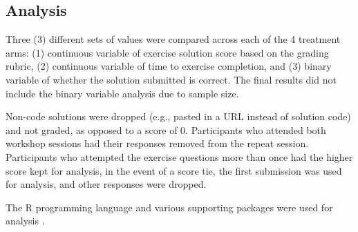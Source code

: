 \documentclass[040-assessment.tex]{subfiles}
\begin{document}
\subsection{Analysis}

    Three (3) different sets of values were compared across each of the 4 treatment arms:
    (1) continuous variable of exercise solution score based on the grading rubric,
    (2) continuous variable of time to exercise completion, and
    (3) binary variable of whether the solution submitted is correct.
    The final results did not include the binary variable analysis due to sample size.

    Non-code solutions were dropped (e.g., pasted in a URL instead of solution code)
    and not graded, as opposed to a score of 0.
    Participants who attended both workshop sessions had their responses removed from the repeat session.
    Participants who attempted the exercise questions more than once had the higher score kept for analysis,
    in the event of a score tie, the first submission was used for analysis,
    and other responses were dropped.

    The R programming language and various supporting packages were used for analysis
    \cite{allaireRmarkdownDynamicDocuments2021a, chenVennDiagramGenerateHighresolution2021a, dahlXtableExportTables2019b, firkeJanitorSimpleTools2021b, ginnQualtRicsDownloadQualtrics2021c, grolemundDatesTimesMade2011b, henryPurrrFunctionalProgramming2020b, henryTidyselectSelectSet2021a, hesterFsCrossplatformFile2021b, hesterGlueInterpretedString2021b, mullerHereSimplerWay2020b, mullerTibbleSimpleData2021b, oomsJsonlitePackagePractical2014b, oomsWritexlExportData2021b, wickhamDplyrGrammarData2021b, wickhamGgplot2ElegantGraphics2016b, wickhamReadrReadRectangular2021b, wickhamReadxlReadExcel2019, wickhamRvestEasilyHarvest2021b, wickhamStringrSimpleConsistent2019b, wickhamTidyrTidyMessy2021b, wickhamWelcomeTidyverse2019c, xieDynamicDocumentsKnitr2015a, xieKnitrComprehensiveTool2014a, xieKnitrGeneralpurposePackage2021a, xieMarkdownCookbook2020a, xieMarkdownDefinitiveGuide2018a, rcoreteamLanguageEnvironmentStatistical2021}.
\end{document}
